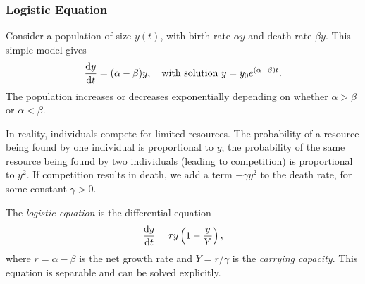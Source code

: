 \documentclass[a4paper]{article}
\begin{document}
\subsubsection{Logistic Equation}
\begin{remark}
  Consider a population of size $y(t)$, with birth rate $\alpha y$ and death rate $\beta y$. This simple model gives
  \[
    \frac{\mathrm{d} y}{\mathrm{d} t} = (\alpha - \beta)y, \quad \text{with solution } y = y_0 e^{(\alpha - \beta)t}.
  \]
  The population increases or decreases exponentially depending on whether $\alpha > \beta$ or $\alpha < \beta$.
\end{remark}

\begin{remark}
  In reality, individuals compete for limited resources. The probability of a resource being found by one individual is proportional to $y$; the probability of the same resource being found by two individuals (leading to competition) is proportional to $y^2$. If competition results in death, we add a term $-\gamma y^2$ to the death rate, for some constant $\gamma > 0$.
\end{remark}

\begin{defi}
  The \emph{logistic equation} is the differential equation
  \[
    \frac{\mathrm{d} y}{\mathrm{d} t} = ry \left(1 - \frac{y}{Y}\right),
  \]
  where $r = \alpha - \beta$ is the net growth rate and $Y = r/\gamma$ is the \emph{carrying capacity}. This equation is separable and can be solved explicitly.
\end{defi}
\end{document}
